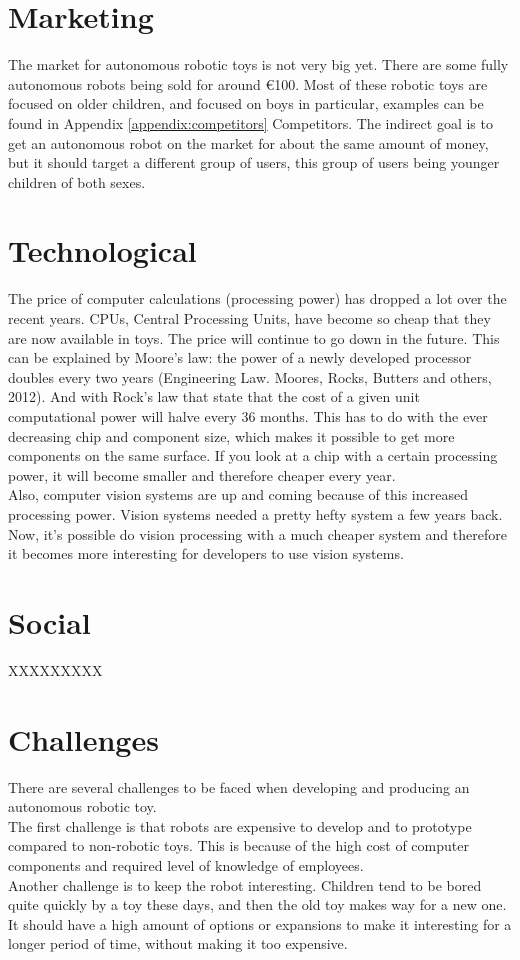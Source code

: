 \documentclass[11pt,twoside,a4paper]{report}
\begin{document}
\section{Marketing}
The market for autonomous robotic toys is not very big yet. There are some fully autonomous robots being sold for around €100. Most of these robotic toys are focused on older children, and focused on boys in particular, examples can be found in Appendix \ref{appendix:competitors} Competitors. The indirect goal is to get an autonomous robot on the market for about the same amount of money, but it should target a different group of users, this group of users being younger children of both sexes.
\section{Technological}
The price of computer calculations (processing power) has dropped a lot over the recent years. CPUs, Central Processing Units, have become so cheap that they are now available in toys. The price will continue to go down in the future. This can be explained by Moore’s law: the power of a newly developed processor doubles every two years (Engineering Law. Moores, Rocks, Butters and others, 2012). And with Rock’s law that state that the cost of a given unit computational power will halve every 36 months. This has to do with the ever decreasing chip and component size, which makes it possible to get more components on the same surface. If you look at a chip with a certain processing power, it will become smaller and therefore cheaper every year. \\
Also, computer vision systems are up and coming because of this increased processing power. Vision systems needed a pretty hefty system a few years back. Now, it’s possible do vision processing with a much cheaper system and therefore it becomes more interesting for developers to use vision systems.
\section{Social}

XXXXXXXXX

\section{Challenges}
There are several challenges to be faced when developing and producing an autonomous robotic toy. \\
The first challenge is that robots are expensive to develop and to prototype compared to non-robotic toys. This is because of the high cost of computer components and required level of knowledge of employees.\\
Another challenge is to keep the robot interesting. Children tend to be bored quite quickly by a toy these days, and then the old toy makes way for a new one. It should have a high amount of options or expansions to make it interesting for a longer period of time, without making it too expensive. 
\end{document}
